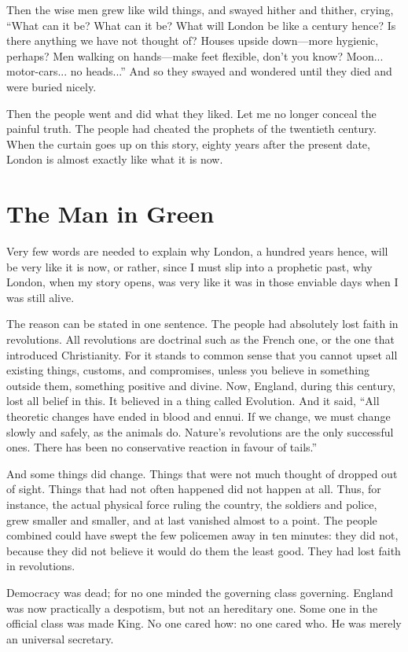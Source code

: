 \documentclass{book}
\begin{document}
Then the wise men grew like wild things, and swayed hither and thither, crying, “What can it be? What can it be? What will London be like a century hence? Is there anything we have not thought of? Houses upside down—more hygienic, perhaps? Men walking on hands—make feet flexible, don’t you know? Moon... motor-cars... no heads...” And so they swayed and wondered until they died and were buried nicely.

Then the people went and did what they liked. Let me no longer conceal the painful truth. The people had cheated the prophets of the twentieth century. When the curtain goes up on this story, eighty years after the present date, London is almost exactly like what it is now.

\chapter{The Man in Green}
\label{chapter-2}
Very few words are needed to explain why London, a hundred years hence, will be very like it is now, or rather, since I must slip into a prophetic past, why London, when my story opens, was very like it was in those enviable days when I was still alive.

The reason can be stated in one sentence. The people had absolutely lost faith in revolutions. All revolutions are doctrinal such as the French one, or the one that introduced Christianity. For it stands to common sense that you cannot upset all existing things, customs, and compromises, unless you believe in something outside them, something positive and divine. Now, England, during this century, lost all belief in this. It believed in a thing called Evolution. And it said, “All theoretic changes have ended in blood and ennui. If we change, we must change slowly and safely, as the animals do. Nature’s revolutions are the only successful ones. There has been no conservative reaction in favour of tails.”

And some things did change. Things that were not much thought of dropped out of sight. Things that had not often happened did not happen at all. Thus, for instance, the actual physical force ruling the country, the soldiers and police, grew smaller and smaller, and at last vanished almost to a point. The people combined could have swept the few policemen away in ten minutes: they did not, because they did not believe it would do them the least good. They had lost faith in revolutions.

Democracy was dead; for no one minded the governing class governing. England was now practically a despotism, but not an hereditary one. Some one in the official class was made King. No one cared how: no one cared who. He was merely an universal secretary.
\end{document}
